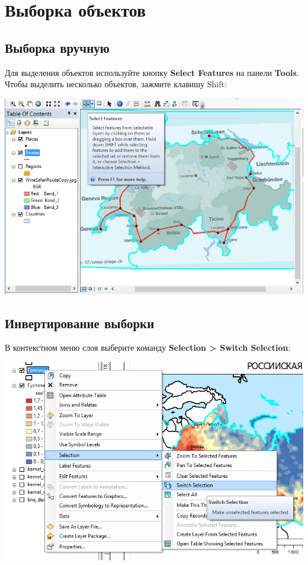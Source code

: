 \documentclass[]{book}
\theoremstyle{definition}
\theoremstyle{definition}
\theoremstyle{definition}
\theoremstyle{remark}
\begin{document}
\hypertarget{manual-select}{%
\chapter{Выборка объектов}\label{manual-select}}

\hypertarget{manual-select-manual}{%
\section{Выборка вручную}\label{manual-select-manual}}

Для выделения объектов используйте кнопку \textbf{Select Features} на
панели \textbf{Tools}. Чтобы выделить несколько объектов, зажмите
клавишу Shift:

\includegraphics{images/Appendix/image94.png}

\hypertarget{manual-select-invert}{%
\section{Инвертирование выборки}\label{manual-select-invert}}

В контекстном меню слоя выберите команду \textbf{Selection
\textgreater{} Switch Selection}:

\includegraphics{images/Appendix/image95.png}
\end{document}
